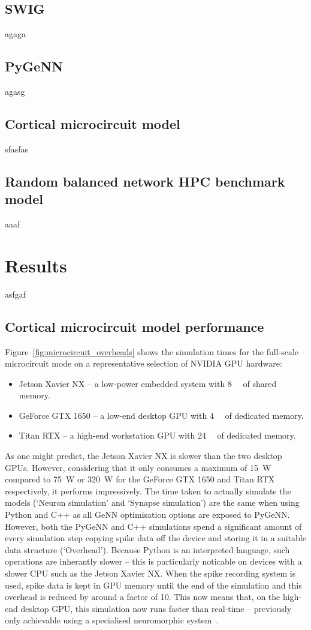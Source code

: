 \documentclass[utf8]{frontiersSCNS} %
\begin{document}
\subsection{SWIG}
agaga

\subsection{PyGeNN}
agasg

\subsection{Cortical microcircuit model}
sfasfas

\subsection{Random balanced network HPC benchmark model}
aaaf

\section{Results}
asfgaf

\subsection{Cortical microcircuit model performance}
Figure~\ref{fig:microcircuit_overheads} shows the simulation times for the full-scale microcircuit mode on a representative selection of NVIDIA GPU hardware:
%
\begin{itemize}
    \item Jetson Xavier NX -- a low-power embedded system with \SI{8}{\giga\byte} of shared memory.
    \item GeForce GTX 1650 -- a low-end desktop GPU with \SI{4}{\giga\byte} of dedicated memory.
    \item Titan RTX -- a high-end workstation GPU with \SI{24}{\giga\byte} of dedicated memory.
\end{itemize}
%
As one might predict, the Jetson Xavier NX is slower than the two desktop GPUs.
However, considering that it only consumes a maximum of \SI{15}{\watt} compared to \SI{75}{\watt} or \SI{320}{\watt} for the GeForce GTX 1650 and Titan RTX respectively, it performs impressively.
The time taken to actually simulate the models (`Neuron simulation' and `Synapse simulation') are the same when using Python and C++ as all GeNN optimisation options are exposed to PyGeNN.
However, both the PyGeNN and C++ simulations spend a significant amount of every simulation step copying spike data off the device and storing it in a suitable data structure (`Overhead').
Because Python is an interpreted language, such operations are inherantly slower -- this is particularly noticable on devices with a slower CPU such as the Jetson Xavier NX.
When the spike recording system is used, spike data is kept in GPU memory until the end of the simulation and this overhead is reduced by around a factor of 10.
This now means that, on the high-end desktop GPU, this simulation now runs faster than real-time -- previously only achievable using a specialised neuromorphic system~\citep{Rhodes2019}.
\end{document}
